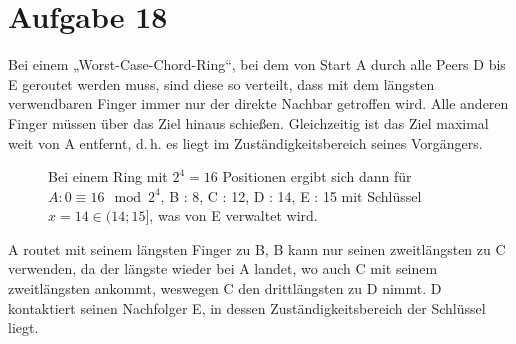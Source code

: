 \documentclass[10pt,a4paper]{article}
\begin{document}
\section*{Aufgabe 18}
Bei einem „Worst-Case-Chord-Ring“, bei dem von Start A durch alle Peers D bis E geroutet werden muss, sind diese so verteilt, dass mit dem längsten verwendbaren Finger immer nur der direkte Nachbar getroffen wird. Alle anderen Finger müssen über das Ziel hinaus schießen. Gleichzeitig ist das Ziel maximal weit von A entfernt, d.\,h. es liegt im Zuständigkeitsbereich seines Vorgängers.



\begin{SCfigure}[\sidecaptionrelwidth][!hb]

    \caption{Bei einem Ring mit $2^{4}=16$ Positionen ergibt sich dann für\mbox{$A : 0 \equiv 16\mod2^{4}$}, B : 8, C : 12, D : 14, E : 15 mit Schlüssel \mbox{$x=14 \in (14;15]$}, was von E verwaltet wird.}
	\centering
{}

\label{fig:Ring}
\end{SCfigure}

A routet mit seinem längsten Finger zu B, B kann nur seinen zweitlängsten zu C verwenden, da der längste wieder bei A landet, wo auch C mit seinem zweitlängsten ankommt, weswegen C den drittlängsten zu D nimmt. D kontaktiert seinen Nachfolger E, in dessen Zuständigkeitsbereich der Schlüssel liegt.
\end{document}
